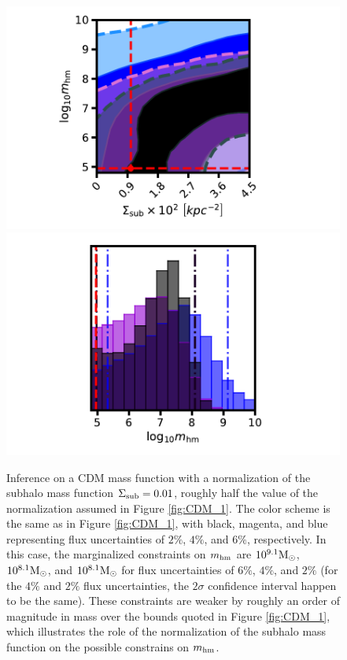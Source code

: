 \begin{figure}
	\includegraphics[clip,trim=2cm 0cm 3.5cm
	0.25cm,width=.48\textwidth,keepaspectratio]{./figures_LOSforward/CDM_lownorm_joint.pdf}
	\includegraphics[clip,trim=2cm 0cm 3.5cm
	0.5cm,width=.48\textwidth,keepaspectratio]{./figures_LOSforward/CDM_lownorm_mhm.pdf}
	\caption{\label{fig:fluxuncertainties_CDM1} Inference on a CDM mass function with a normalization of the subhalo mass function $\Sigma_{\rm{sub}} = 0.01$, roughly half the value of the normalization assumed in Figure \ref{fig:CDM_1}. The color scheme is the same as in Figure \ref{fig:CDM_1}, with black, magenta, and blue representing flux uncertainties of $2\%$, $4\%$, and $6\%$, respectively. In this case, the marginalized constraints on ${m_{\rm{hm}}}$ are $10^{9.1} {\rm{M}_{\odot}}$, $10^{8.1} {\rm{M}_{\odot}}$, and $10^{8.1} {\rm{M}_{\odot}}$ for flux uncertainties of $6 \%$, $4\%$, and $2 \%$ (for the $4\%$ and $2\%$ flux uncertainties, the $2 \sigma$ confidence interval happen to be the same). These constraints are weaker by roughly an order of magnitude in mass over the bounds quoted in Figure \ref{fig:CDM_1}, which illustrates the role of the normalization of the subhalo mass function on the possible constrains on ${m_{\rm{hm}}}$.}
\end{figure}	
